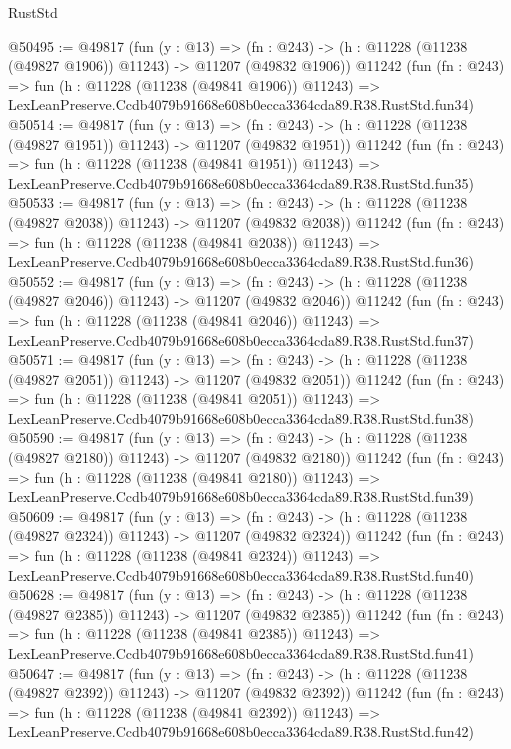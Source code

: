 \begin{lexlean}{RustStd}
\begin{coremodule}
@50495 := @49817
    (fun (y : @13) =>
    (fn : @243) -> (h : @11228 (@11238 (@49827 @1906)) @11243) -> @11207 (@49832 @1906))
    @11242
    (fun (fn : @243) =>
    fun (h : @11228 (@11238 (@49841 @1906)) @11243) =>
    LexLeanPreserve.Ccdb4079b91668e608b0ecca3364cda89.R38.RustStd.fun34)
@50514 := @49817
    (fun (y : @13) =>
    (fn : @243) -> (h : @11228 (@11238 (@49827 @1951)) @11243) -> @11207 (@49832 @1951))
    @11242
    (fun (fn : @243) =>
    fun (h : @11228 (@11238 (@49841 @1951)) @11243) =>
    LexLeanPreserve.Ccdb4079b91668e608b0ecca3364cda89.R38.RustStd.fun35)
@50533 := @49817
    (fun (y : @13) =>
    (fn : @243) -> (h : @11228 (@11238 (@49827 @2038)) @11243) -> @11207 (@49832 @2038))
    @11242
    (fun (fn : @243) =>
    fun (h : @11228 (@11238 (@49841 @2038)) @11243) =>
    LexLeanPreserve.Ccdb4079b91668e608b0ecca3364cda89.R38.RustStd.fun36)
@50552 := @49817
    (fun (y : @13) =>
    (fn : @243) -> (h : @11228 (@11238 (@49827 @2046)) @11243) -> @11207 (@49832 @2046))
    @11242
    (fun (fn : @243) =>
    fun (h : @11228 (@11238 (@49841 @2046)) @11243) =>
    LexLeanPreserve.Ccdb4079b91668e608b0ecca3364cda89.R38.RustStd.fun37)
@50571 := @49817
    (fun (y : @13) =>
    (fn : @243) -> (h : @11228 (@11238 (@49827 @2051)) @11243) -> @11207 (@49832 @2051))
    @11242
    (fun (fn : @243) =>
    fun (h : @11228 (@11238 (@49841 @2051)) @11243) =>
    LexLeanPreserve.Ccdb4079b91668e608b0ecca3364cda89.R38.RustStd.fun38)
@50590 := @49817
    (fun (y : @13) =>
    (fn : @243) -> (h : @11228 (@11238 (@49827 @2180)) @11243) -> @11207 (@49832 @2180))
    @11242
    (fun (fn : @243) =>
    fun (h : @11228 (@11238 (@49841 @2180)) @11243) =>
    LexLeanPreserve.Ccdb4079b91668e608b0ecca3364cda89.R38.RustStd.fun39)
@50609 := @49817
    (fun (y : @13) =>
    (fn : @243) -> (h : @11228 (@11238 (@49827 @2324)) @11243) -> @11207 (@49832 @2324))
    @11242
    (fun (fn : @243) =>
    fun (h : @11228 (@11238 (@49841 @2324)) @11243) =>
    LexLeanPreserve.Ccdb4079b91668e608b0ecca3364cda89.R38.RustStd.fun40)
@50628 := @49817
    (fun (y : @13) =>
    (fn : @243) -> (h : @11228 (@11238 (@49827 @2385)) @11243) -> @11207 (@49832 @2385))
    @11242
    (fun (fn : @243) =>
    fun (h : @11228 (@11238 (@49841 @2385)) @11243) =>
    LexLeanPreserve.Ccdb4079b91668e608b0ecca3364cda89.R38.RustStd.fun41)
@50647 := @49817
    (fun (y : @13) =>
    (fn : @243) -> (h : @11228 (@11238 (@49827 @2392)) @11243) -> @11207 (@49832 @2392))
    @11242
    (fun (fn : @243) =>
    fun (h : @11228 (@11238 (@49841 @2392)) @11243) =>
    LexLeanPreserve.Ccdb4079b91668e608b0ecca3364cda89.R38.RustStd.fun42)

\end{coremodule}
\end{lexlean}

